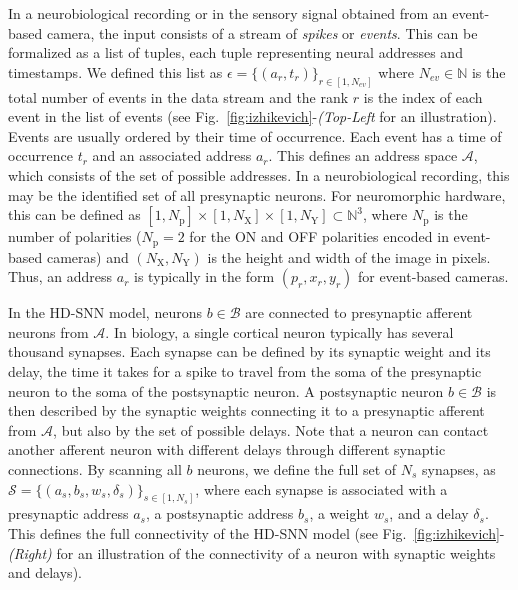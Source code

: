 \documentclass[default]{sn-jnl}%
\theoremstyle{thmstyleone}%
\theoremstyle{thmstyletwo}%
\theoremstyle{thmstylethree}%
\newcommand{\seeFig}[1]{see Fig.~\ref{fig:#1}}%
\newcommand{\presynaddr}{a} %
\newcommand{\postsynaddr}{b} %
\newcommand{\numevent}{N_{ev}} %
\newcommand{\presynaddrspace}{\mathcal{A}} %
\newcommand{\postsynaddrspace}{\mathcal{B}} %
\newcommand{\Npol}{N_\text{p}} %
\newcommand{\arank}{r} %
\newcommand{\synapse}{\mathcal{S}} %
\newcommand{\synapticweight}{w} %
\newcommand{\synapticdelay}{\delta} %
\newcommand{\ranksyn}{s} %
\newcommand{\Nsyn}{N_{s}} %
\newcommand{\timev}{t} %
\newcommand{\polev}{p} %
\newcommand{\event}{\epsilon} %
\newcommand{\Nx}{N_\text{X}}
\newcommand{\Ny}{N_\text{Y}}
\begin{document}
In a neurobiological recording or in the sensory signal obtained from an event-based camera, the input consists of a stream of \emph{spikes} or \emph{events}. This can be formalized as a list of tuples, each tuple representing neural addresses and timestamps. We defined this list as $\event = \{(\presynaddr_\arank, \timev_\arank)\}_{\arank \in [1,\numevent]}$ where $\numevent \in \mathbb{N} $ is the total number of events in the data stream and the rank $\arank$ is the index of each event in the list of events (\seeFig{izhikevich}-\textit{(Top-Left} for an illustration). Events are usually ordered by their time of occurrence. Each event has a time of occurrence $\timev_\arank$ and an associated address $\presynaddr_\arank$. This defines an address space $\presynaddrspace$, which consists of the set of possible addresses. In a neurobiological recording, this may be the identified set of all presynaptic neurons. For neuromorphic hardware, this can be defined as $[1, \Npol] \times [1, \Nx]\times[1, \Ny] \subset \mathbb{N}^3$, where $\Npol$ is the number of polarities ($\Npol=2$ for the ON and OFF polarities encoded in event-based cameras) and $(\Nx, \Ny)$ is the height and width of the image in pixels. Thus, an address $\presynaddr_\arank$ is typically in the form $(\polev_\arank, x_\arank, y_\arank)$ for event-based cameras.

In the HD-SNN model, neurons $\postsynaddr \in \postsynaddrspace$ are connected to presynaptic afferent neurons from $\presynaddrspace$. In biology, a single cortical neuron typically has several thousand synapses. Each synapse can be defined by its synaptic weight and its delay, the time it takes for a spike to travel from the soma of the presynaptic neuron to the soma of the postsynaptic neuron. A postsynaptic neuron $\postsynaddr \in \postsynaddrspace$ is then described by the synaptic weights connecting it to a presynaptic afferent from $\presynaddrspace$, but also by the set of possible delays. Note that a neuron can contact another afferent neuron with different delays through different synaptic connections. By scanning all $\postsynaddr$ neurons, we define the full set of $\Nsyn$ synapses, 
as $\synapse = \{(\presynaddr_\ranksyn, \postsynaddr_\ranksyn, \synapticweight_\ranksyn, \synapticdelay_\ranksyn)\}_{\ranksyn \in [1,\Nsyn]}$, where each synapse is associated with a presynaptic address $\presynaddr_\ranksyn$, a postsynaptic address $\postsynaddr_\ranksyn$, a weight $\synapticweight_\ranksyn$, and a delay $\synapticdelay_\ranksyn$. This defines the full connectivity of the HD-SNN model (\seeFig{izhikevich}-\textit{(Right)} for an illustration of the connectivity of a neuron with synaptic weights and delays).
\end{document}
